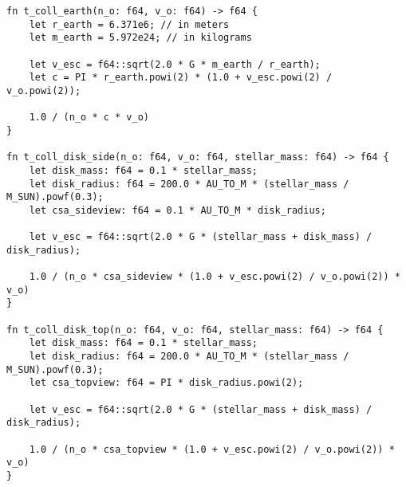 \begin{lstlisting}
fn t_coll_earth(n_o: f64, v_o: f64) -> f64 {
    let r_earth = 6.371e6; // in meters
    let m_earth = 5.972e24; // in kilograms

    let v_esc = f64::sqrt(2.0 * G * m_earth / r_earth);
    let c = PI * r_earth.powi(2) * (1.0 + v_esc.powi(2) / v_o.powi(2));

    1.0 / (n_o * c * v_o)
}

fn t_coll_disk_side(n_o: f64, v_o: f64, stellar_mass: f64) -> f64 {
    let disk_mass: f64 = 0.1 * stellar_mass;
    let disk_radius: f64 = 200.0 * AU_TO_M * (stellar_mass / M_SUN).powf(0.3);
    let csa_sideview: f64 = 0.1 * AU_TO_M * disk_radius;

    let v_esc = f64::sqrt(2.0 * G * (stellar_mass + disk_mass) / disk_radius);

    1.0 / (n_o * csa_sideview * (1.0 + v_esc.powi(2) / v_o.powi(2)) * v_o)
}

fn t_coll_disk_top(n_o: f64, v_o: f64, stellar_mass: f64) -> f64 {
    let disk_mass: f64 = 0.1 * stellar_mass;
    let disk_radius: f64 = 200.0 * AU_TO_M * (stellar_mass / M_SUN).powf(0.3);
    let csa_topview: f64 = PI * disk_radius.powi(2);

    let v_esc = f64::sqrt(2.0 * G * (stellar_mass + disk_mass) / disk_radius);

    1.0 / (n_o * csa_topview * (1.0 + v_esc.powi(2) / v_o.powi(2)) * v_o)
}
\end{lstlisting}